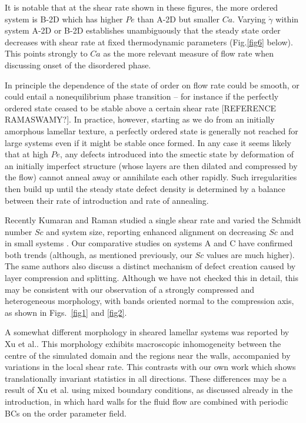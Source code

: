 \documentclass[8.5pt,twoside,twocolumn]{article}
\begin{document}
It is notable that at the shear rate shown in these figures, the more ordered system is B-2D which has higher $Pe$ than A-2D but smaller $Ca$. Varying $\dot\gamma$ within system A-2D or B-2D establishes unambiguously that the steady state order decreases with shear rate at fixed thermodynamic parameters (Fig.\ref{fig6} below). This points strongly to $Ca$ as the more relevant measure of flow rate when discussing onset of the disordered phase. 

In principle the dependence of the state of order on flow rate could be smooth, or could entail a nonequilibrium phase transition -- for instance if the perfectly ordered state ceased to be stable above a certain shear rate \cite{Gonnella98,Zilman99,Kumaran2001} [REFERENCE RAMASWAMY?]. In practice, however, starting as we do from an initially amorphous lamellar texture, a perfectly ordered state is generally not reached for large systems even if it might be stable once formed. In any case it seems likely that at high $Pe$, any defects introduced into the smectic state by deformation of an initially imperfect structure (whose layers are then dilated and compressed by the flow) cannot anneal away or annihilate each other rapidly. Such irregularities then build up until the steady state defect density is determined by a balance between their rate of introduction and rate of annealing. 

Recently Kumaran and Raman studied a single shear rate and varied the Schmidt number $Sc$ and system size, reporting enhanced alignment on decreasing $Sc$ and in small systems \cite{Kumaran2011}. Our comparative studies on systems A and C have confirmed both trends (although, as mentioned previously, our $Sc$ values are much higher). The same authors also discuss a distinct mechanism of defect creation caused by layer compression and splitting. Although we have not checked this in detail, this may be consistent with our observation of a strongly compressed and heterogeneous morphology, with bands oriented normal to the compression axis, as shown in Figs.~\ref{fig1} and \ref{fig2}.

A somewhat different morphology in sheared lamellar systems was reported by Xu et al.\cite{Xu06b}. This morphology exhibits macroscopic inhomogeneity between the centre of the simulated domain and the regions near the walls, accompanied by variations in the local shear rate. This contrasts with our own work which shows translationally invariant statistics in all directions. These differences may be a result of Xu et al.\cite{Xu06b} using mixed boundary conditions, as discussed already in the introduction, in which hard walls for the fluid flow are combined with periodic BCs on the order parameter field. 
\end{document}
